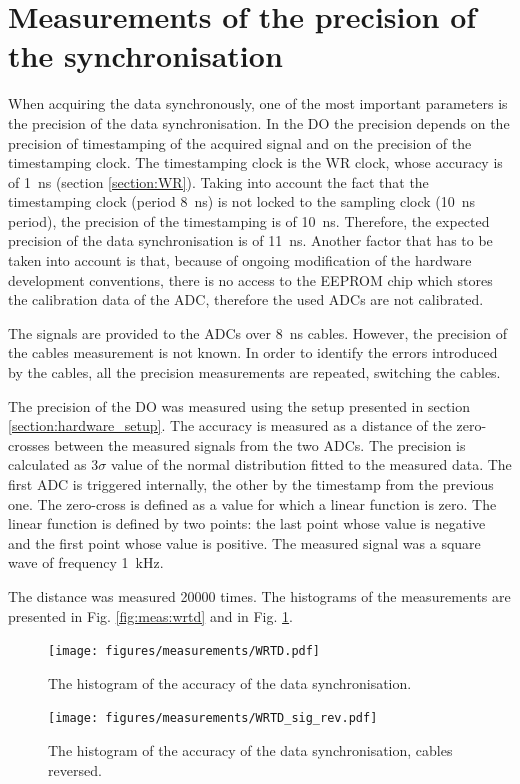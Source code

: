 \section{Measurements of the precision of the synchronisation} \label{section:precision_measurements}
    When acquiring the data synchronously, one of the most important parameters is the precision of the data synchronisation. In the DO the precision depends on the precision of timestamping of the acquired signal and on the precision of the timestamping clock. The timestamping clock is the WR clock, whose accuracy is of 1~ns (section \ref{section:WR}). Taking into account the fact that the timestamping clock (period 8~ns) is not locked to the sampling clock (10~ns period), the precision of the timestamping is of 10~ns. Therefore, the expected precision of the data synchronisation is of 11~ns.
    Another factor that has to be taken into account is that, because of ongoing modification of the hardware development conventions, there is no access to the EEPROM chip which stores the calibration data of the ADC, therefore the used ADCs are not calibrated.
    
    The signals are provided to the ADCs over 8~ns cables. However, the precision of the cables measurement is not known. In order to identify the errors introduced by the cables, all the precision measurements are repeated, switching the cables.
    
    The precision of the DO was measured using the setup presented in section \ref{section:hardware_setup}.
    The accuracy is measured as a distance of the zero-crosses between the measured signals from the two ADCs. The precision is calculated as 3$\sigma$ value of the normal distribution fitted to the measured data. The first ADC is triggered internally, the other by the timestamp from the previous one. The zero-cross is defined as a value for which a linear function is zero. The linear function is defined by two points: the last point whose value is negative and the first point whose value is positive. The measured signal was a square wave of frequency 1~kHz.
    
    The distance was measured 20000 times. The histograms of the measurements are presented in Fig. \ref{fig:meas:wrtd} and in Fig. \ref{fig:meas:wrtd_sig_rev}.
    
    \begin{figure}
        \centering
        \begin{minipage}[b]{0.8\textwidth}
        	\texttt{[image: figures/measurements/WRTD.pdf]}
        	\caption{The histogram of the accuracy of the data synchronisation.}
            \label{fig:meas:wrtd}
        \end{minipage}
        \vfill
        \vspace{0.5cm}
        \begin{minipage}[b]{0.8\textwidth}
        	\texttt{[image: figures/measurements/WRTD\_sig\_rev.pdf]}
        	\caption{The histogram of the accuracy of the data synchronisation, cables reversed.}
            \label{fig:meas:wrtd_sig_rev}
        \end{minipage}
    \end{figure}
    
